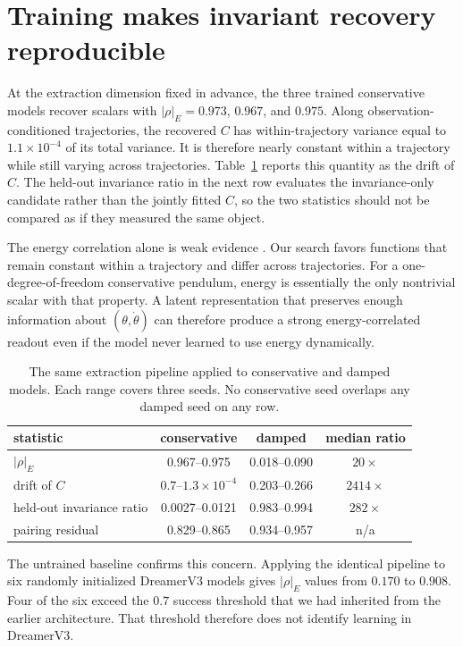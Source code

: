 \section{Training makes invariant recovery reproducible}
\label{sec:recovery}

At the extraction dimension fixed in advance, the three trained conservative models recover scalars
with $|\rho|_E = 0.973$, $0.967$, and $0.975$. Along observation-conditioned trajectories, the
recovered $C$ has within-trajectory variance equal to $1.1\times10^{-4}$ of its total variance. It is
therefore nearly constant within a trajectory while still varying across trajectories.
Table~\ref{tab:refusal} reports this quantity as the drift of $C$. The held-out invariance ratio in
the next row evaluates the invariance-only candidate rather than the jointly fitted $C$, so the two
statistics should not be compared as if they measured the same object.

The energy correlation alone is weak evidence \citep{hewitt2019control,belinkov2022probing}. Our
search favors functions that remain constant within a trajectory and differ across trajectories. For
a one-degree-of-freedom conservative pendulum, energy is essentially the only nontrivial scalar with
that property. A latent representation that preserves enough information about
$(\theta,\dot\theta)$ can therefore produce a strong energy-correlated readout even if the model
never learned to use energy dynamically.

\begin{table}[t]
\centering\small
\caption{The same extraction pipeline applied to conservative and damped models. Each range covers
three seeds. No conservative seed overlaps any damped seed on any row.}
\label{tab:refusal}
\begin{tabular}{lccc}
\toprule
statistic & conservative & damped & median ratio \\
\midrule
$|\rho|_E$ & 0.967--0.975 & 0.018--0.090 & $20\times$ \\
drift of $C$ & $0.7$--$1.3\times10^{-4}$ & 0.203--0.266 & $2414\times$ \\
held-out invariance ratio & 0.0027--0.0121 & 0.983--0.994 & $282\times$ \\
pairing residual & 0.829--0.865 & 0.934--0.957 & n/a \\
\bottomrule
\end{tabular}
\end{table}

The untrained baseline confirms this concern. Applying the identical pipeline to six randomly
initialized DreamerV3 models gives $|\rho|_E$ values from $0.170$ to $0.908$. Four of the six exceed
the $0.7$ success threshold that we had inherited from the earlier architecture. That threshold
therefore does not identify learning in DreamerV3.

